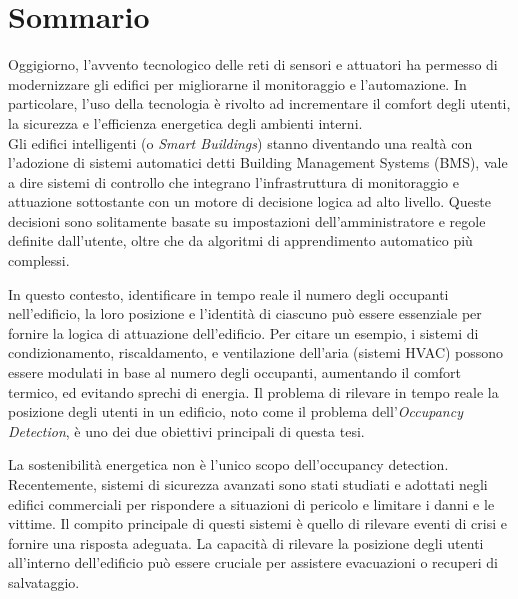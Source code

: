%
\cleardoublepage
%
{}


%
\chapter*{Sommario}
Oggigiorno, l'avvento tecnologico delle reti di sensori e attuatori ha permesso di modernizzare gli edifici per migliorarne il monitoraggio e l'automazione. In particolare, l'uso della tecnologia è rivolto ad incrementare il comfort degli utenti, la sicurezza e l'efficienza energetica degli ambienti interni.\\
Gli edifici intelligenti (o \emph{Smart Buildings}) stanno diventando una realtà con l'adozione di sistemi automatici detti Building Management Systems (BMS), vale a dire sistemi di controllo che integrano l'infrastruttura di monitoraggio e attuazione sottostante con un motore di decisione logica ad alto livello. Queste decisioni sono solitamente basate su impostazioni dell'amministratore e regole definite dall'utente, oltre che da algoritmi di apprendimento automatico più complessi.

In questo contesto, identificare in tempo reale il numero degli occupanti nell'edificio, la loro posizione e l'identità di ciascuno può essere essenziale per fornire la logica di attuazione dell'edificio. Per citare un esempio, i sistemi di condizionamento, riscaldamento, e ventilazione dell'aria (sistemi HVAC) possono essere modulati in base al numero degli occupanti, aumentando il comfort termico, ed evitando sprechi di energia. Il problema di rilevare in tempo reale la posizione degli utenti in un edificio, noto come il problema dell'\emph{Occupancy Detection}, è uno dei due obiettivi principali di questa tesi.

La sostenibilità energetica non è l'unico scopo dell'occupancy detection. Recentemente, sistemi di sicurezza avanzati sono stati studiati e adottati negli edifici commerciali per rispondere a situazioni di pericolo e limitare i danni e le vittime. Il compito principale di questi sistemi è quello di rilevare eventi di crisi e fornire una risposta adeguata. La capacità di rilevare la posizione degli utenti all'interno dell'edificio può essere cruciale per assistere evacuazioni o recuperi di salvataggio.

